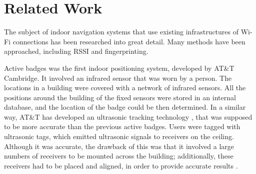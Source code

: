 \section{Related Work}

The subject of indoor navigation systems that use existing infrastructures of Wi-Fi connections has been researched into great detail. Many methods have been approached, including RSSI and fingerprinting.



Active badges \cite{ips-survey-paper} was the first indoor positioning system, developed by AT\&T Cambridge. It involved an infrared sensor that was worn by a person. The locations in a building were covered with a network of infrared sensors. All the positions around the building of the fixed sensors were stored in an internal database, and the location of the badge could be then determined. In a similar way, AT\&T has developed an ultrasonic tracking technology \cite{ips-survey-paper}, that was supposed to be more accurate than the previous active badges. Users were tagged with ultrasonic tags, which emitted ultrasonic signals to receivers on the ceiling. Although it was accurate, the drawback of this was that it involved a large numbers of receivers to be mounted across the building; additionally, these receivers had to be placed and aligned, in order to provide accurate results \cite{ips-survey-paper}.

